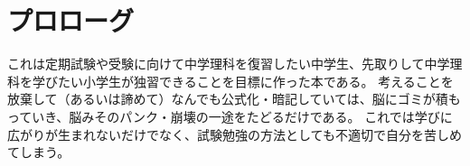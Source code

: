 \chapter{プロローグ}

これは定期試験や受験に向けて中学理科を復習したい中学生、先取りして中学理科を学びたい小学生が独習できることを目標に作った本である。
考えることを放棄して（あるいは諦めて）なんでも公式化・暗記していては、脳にゴミが積もっていき、脳みそのパンク・崩壊の一途をたどるだけである。
これでは学びに広がりが生まれないだけでなく、試験勉強の方法としても不適切で自分を苦しめてしまう。

